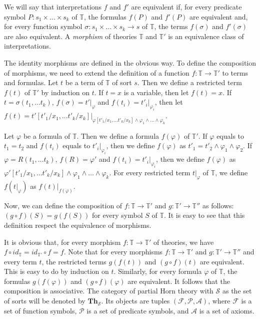 \documentclass[reqno]{amsart}
\theoremstyle{definition}
\theoremstyle{remark}
\newcommand{\cat}[1]{\mathbf{#1}}
\newcommand{\Th}{\cat{Th}}
\numberwithin{figure}{section}
\begin{document}
We will say that interpretations $f$ and $f'$ are equivalent if,
for every predicate symbol $P : s_1 \times \ldots \times s_k$ of $\mathbb{T}$, the formulas $f(P)$ and $f'(P)$ are equivalent
and, for every function symbol $\sigma : s_1 \times \ldots \times s_k \to s$ of $\mathbb{T}$, the terms $f(\sigma)$ and $f'(\sigma)$ are also equivalent.
A \emph{morphism} of theories $\mathbb{T}$ and $\mathbb{T}'$ is an equivalence class of interpretations.

The identity morphisms are defined in the obvious way.
To define the composition of morphisms, we need to extend the definition of a function $f : \mathbb{T} \to \mathbb{T}'$ to terms and formulas.
Let $t$ be a term of $\mathbb{T}$ of sort $s$.
Then we define a restricted term $f(t)$ of $\mathbb{T}'$ by induction on $t$.
If $t = x$ is a variable, then let $f(t) = x$.
If $t = \sigma(t_1, \ldots t_k)$, $f(\sigma) = t'|_\varphi$ and $f(t_i) = t'_i|_{\varphi_i}$,
then let $f(t) = t'[t'_1/x_1, \ldots t'_k/x_k]|_{\varphi[t'_1/x_1, \ldots t'_k/x_k] \land \varphi_1 \land \ldots \land \varphi_k}$.

Let $\varphi$ be a formula of $\mathbb{T}$.
Then we define a formula $f(\varphi)$ of $\mathbb{T}'$.
If $\varphi$ equals to $t_1 = t_2$ and $f(t_i)$ equals to $t'_i|_{\varphi_i}$, then we define $f(\varphi)$ as $t'_1 = t'_2 \land \varphi_1 \land \varphi_2$.
If $\varphi = R(t_1, \ldots t_k)$, $f(R) = \varphi'$ and $f(t_i) = t'_i|_{\varphi_i}$,
then we define $f(\varphi)$ as $\varphi'[t'_1/x_1, \ldots t'_k/x_k] \land \varphi_1 \land \ldots \land \varphi_k$.
For every restricted term $t|_\varphi$ of $\mathbb{T}$, we define $f(t|_\varphi)$ as $f(t)|_{f(\varphi)}$.

Now, we can define the composition of $f : \mathbb{T} \to \mathbb{T}'$ and $g : \mathbb{T}' \to \mathbb{T}''$
as follows: $(g \circ f)(S) = g(f(S))$ for every symbol $S$ of $\mathbb{T}$.
It is easy to see that this definition respect the equivalence of morphisms.

It is obvious that, for every morphism $f : \mathbb{T} \to \mathbb{T}'$ of theories, we have $f \circ id_\mathbb{T} = id_{\mathbb{T}'} \circ f = f$.
Note that for every morphisms $f : \mathbb{T} \to \mathbb{T}'$ and $g : \mathbb{T}' \to \mathbb{T}''$ and every term $t$,
the restricted terms $g(f(t))$ and $(g \circ f)(t)$ are equivalent.
This is easy to do by induction on $t$.
Similarly, for every formula $\varphi$ of $\mathbb{T}$, the formulas $g(f(\varphi))$ and $(g \circ f)(\varphi)$ are equivalent.
It follows that the composition is associative.
The category of partial Horn theory with $\mathcal{S}$ as the set of sorts will be denoted by $\Th_\mathcal{S}$.
Its objects are tuples $(\mathcal{F},\mathcal{P},\mathcal{A})$, where $\mathcal{F}$ is a set of function symbols,
$\mathcal{P}$ is a set of predicate symbols, and $\mathcal{A}$ is a set of axioms.
\end{document}
